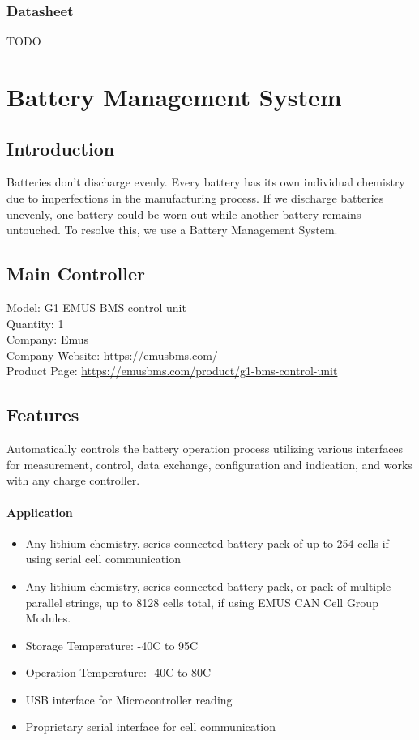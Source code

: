 \subsubsection{Datasheet}
TODO

\section{Battery Management System}

\subsection{Introduction}
Batteries don’t discharge evenly. Every battery has its own individual chemistry due to imperfections in the manufacturing process. If we discharge batteries unevenly, one battery could be worn out while another battery remains untouched. To resolve this, we use a Battery Management System.\\

\subsection{Main Controller}

Model: G1 EMUS BMS control unit\\
Quantity: 1\\
Company: Emus\\
Company Website: \href{https://emusbms.com/}{https://emusbms.com/} \\
Product Page: \href{https://emusbms.com/product/g1-bms-control-unit}{https://emusbms.com/product/g1-bms-control-unit} \\

\subsection{Features}
Automatically controls the battery operation process utilizing various interfaces for measurement, control, data exchange, configuration and indication, and works with any charge controller.
\paragraph{Application}
\begin{itemize}
	\item Any lithium chemistry, series connected battery pack of up to 254 cells if using serial cell communication
	\item Any lithium chemistry, series connected battery pack, or pack of multiple parallel strings, up to 8128 cells total, if using EMUS CAN Cell Group Modules.
	\item Storage Temperature: -40\degree C to 95\degree C
	\item Operation Temperature: -40\degree C to 80\degree C
	\item USB interface for Microcontroller reading
	\item Proprietary serial interface for cell communication
\end{itemize}

